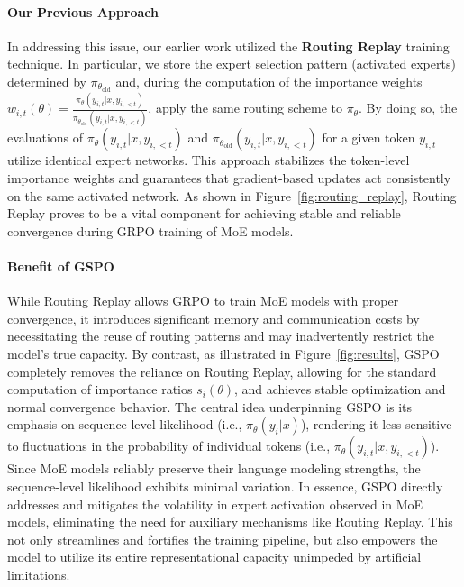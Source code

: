 \paragraph{Our Previous Approach} In addressing this issue, our earlier work utilized the \textbf{Routing Replay} training technique. In particular, we store the expert selection pattern (activated experts) determined by $\pi_{\theta_\text{old}}$ and, during the computation of the importance weights $w_{i,t}(\theta) = \frac{ \pi_{\theta} (y_{i,t} | x, y_{i,<t}) }{ \pi_{\theta_\text{old}} (y_{i,t} | x,y_{i,<t})}$, apply the same routing scheme to $\pi_{\theta}$. By doing so, the evaluations of $\pi_{\theta} (y_{i,t} | x, y_{i,<t})$ and $\pi_{\theta_\text{old}} (y_{i,t} | x,y_{i,<t})$ for a given token $y_{i,t}$ utilize identical expert networks. This approach stabilizes the token-level importance weights and guarantees that gradient-based updates act consistently on the same activated network. As shown in Figure~\ref{fig:routing_replay}, Routing Replay proves to be a vital component for achieving stable and reliable convergence during GRPO training of MoE models.

\paragraph{Benefit of GSPO} While Routing Replay allows GRPO to train MoE models with proper convergence, it introduces significant memory and communication costs by necessitating the reuse of routing patterns and may inadvertently restrict the model’s true capacity. By contrast, as illustrated in Figure~\ref{fig:results}, GSPO completely removes the reliance on Routing Replay, allowing for the standard computation of importance ratios $s_i(\theta)$, and achieves stable optimization and normal convergence behavior. The central idea underpinning GSPO is its emphasis on sequence-level likelihood (i.e., $\pi_{\theta} (y_i | x)$), rendering it less sensitive to fluctuations in the probability of individual tokens (i.e., $\pi_{\theta} (y_{i,t} | x, y_{i,<t})$). Since MoE models reliably preserve their language modeling strengths, the sequence-level likelihood exhibits minimal variation. In essence, GSPO directly addresses and mitigates the volatility in expert activation observed in MoE models, eliminating the need for auxiliary mechanisms like Routing Replay. This not only streamlines and fortifies the training pipeline, but also empowers the model to utilize its entire representational capacity unimpeded by artificial limitations.

